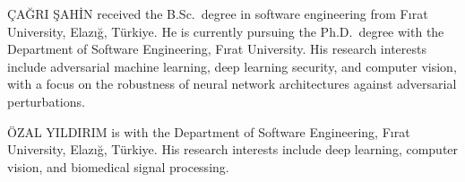 
\begin{IEEEbiographynophoto}{\c{C}A\u{G}RI \c{S}AH\.IN}
received the B.Sc.\ degree in software engineering from F{\i}rat University, Elaz{\i}\u{g}, T\"urkiye. He is currently pursuing the Ph.D.\ degree with the Department of Software Engineering, F{\i}rat University. His research interests include adversarial machine learning, deep learning security, and computer vision, with a focus on the robustness of neural network architectures against adversarial perturbations.
\end{IEEEbiographynophoto}

\begin{IEEEbiographynophoto}{\"OZAL YILDIRIM}
is with the Department of Software Engineering, F{\i}rat University, Elaz{\i}\u{g}, T\"urkiye. His research interests include deep learning, computer vision, and biomedical signal processing.
\end{IEEEbiographynophoto}
